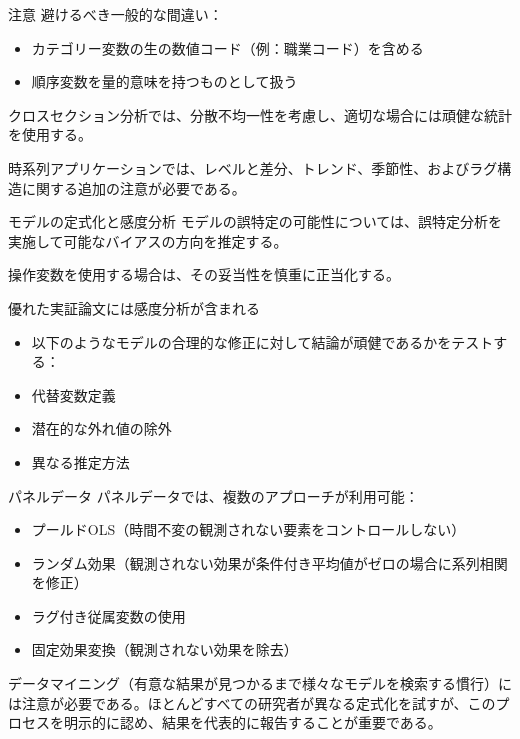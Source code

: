 \documentclass[
  ignorenonframetext,
]{beamer}
\providecommand{\tightlist}{%
  \setlength{\itemsep}{0pt}\setlength{\parskip}{0pt}}
\begin{document}
\begin{frame}{注意}
\label{ux6ce8ux610f}
避けるべき一般的な間違い：

\begin{itemize}
\tightlist
\item
  カテゴリー変数の生の数値コード（例：職業コード）を含める
\item
  順序変数を量的意味を持つものとして扱う
\end{itemize}

クロスセクション分析では、分散不均一性を考慮し、適切な場合には頑健な統計を使用する。

時系列アプリケーションでは、レベルと差分、トレンド、季節性、およびラグ構造に関する追加の注意が必要である。
\end{frame}

\begin{frame}{モデルの定式化と感度分析}
\label{ux30e2ux30c7ux30ebux306eux5b9aux5f0fux5316ux3068ux611fux5ea6ux5206ux6790}
モデルの誤特定の可能性については、誤特定分析を実施して可能なバイアスの方向を推定する。

操作変数を使用する場合は、その妥当性を慎重に正当化する。

優れた実証論文には感度分析が含まれる

\begin{itemize}
\tightlist
\item
  以下のようなモデルの合理的な修正に対して結論が頑健であるかをテストする：
\item
  代替変数定義
\item
  潜在的な外れ値の除外
\item
  異なる推定方法
\end{itemize}
\end{frame}

\begin{frame}{パネルデータ}
\label{ux30d1ux30cdux30ebux30c7ux30fcux30bf-1}
パネルデータでは、複数のアプローチが利用可能：

\begin{itemize}
\tightlist
\item
  プールドOLS（時間不変の観測されない要素をコントロールしない）
\item
  ランダム効果（観測されない効果が条件付き平均値がゼロの場合に系列相関を修正）
\item
  ラグ付き従属変数の使用
\item
  固定効果変換（観測されない効果を除去）
\end{itemize}

データマイニング（有意な結果が見つかるまで様々なモデルを検索する慣行）には注意が必要である。ほとんどすべての研究者が異なる定式化を試すが、このプロセスを明示的に認め、結果を代表的に報告することが重要である。
\end{frame}
\end{document}
